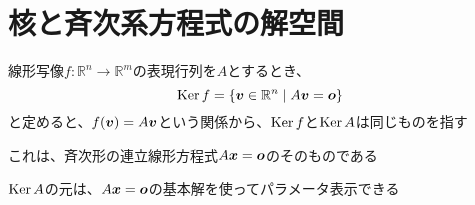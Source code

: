 \documentclass[../../../topic_linear-algebra]{subfiles}
\begin{document}
\sectionline
\section{核と斉次系方程式の解空間}

線形写像$f\colon \mathbb{R}^n \to \mathbb{R}^m$の表現行列を$A$とするとき、
\begin{equation*}
  \operatorname{Ker} f = \{ \vb*{v} \in \mathbb{R}^n \mid A\vb*{v} = \vb*{o} \}
\end{equation*}
と定めると、$f(\vb*{v}) = A\vb*{v}$という関係から、$\operatorname{Ker} f$と$\operatorname{Ker} A$は同じものを指す

\br

これは、斉次形の連立線形方程式$A\vb*{x} = \vb*{o}$のそのものである

$\operatorname{Ker} A$の元は、$A\vb*{x} = \vb*{o}$の基本解を使ってパラメータ表示できる
\end{document}
